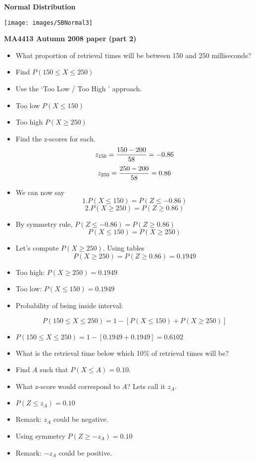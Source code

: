 \documentclass[]{report}
\begin{document}
\noindent \textbf{Normal Distribution}

\begin{center}
	\texttt{[image: images/5BNormal3]}
\end{center}


{
	\noindent \textbf{MA4413 Autumn 2008 paper (part 2)}
	\begin{itemize}
		\item What proportion of retrieval times will be between 150 and 250 milliseconds?
		\item Find $P(150 \leq X \leq 250)$
		\item Use the `Too Low / Too High ' approach.
		\item Too low $P( X \leq 150)$
		\item Too high $P( X \geq 250)$
		\item Find the z-scores for each.
		\[ z_{150} =  {150 - 200 \over 58}  = -0.86 \]
		\[ z_{250} =  {250 - 200 \over 58}  = 0.86 \]
	\end{itemize}
	\begin{itemize}
		\item We can now say
		\[ 1. P( X \leq 150) = P( Z \leq -0.86)\]
		\[ 2. P( X \geq 250) = P( Z \geq 0.86)\]
		\item By symmetry rule, $P( Z \leq -0.86) = P( Z \geq 0.86)$
		\[ P( X \leq 150) =  P( X \geq 250) \]
		\item Let's compute $P( X \geq 250)$. Using tables
		\[P( X \geq 250) = P( Z \geq 0.86) = 0.1949 \]
	\end{itemize}
	\begin{itemize}
		\item Too high: $P( X \geq 250) = 0.1949 $
		\item Too low:  $P( X \leq 150) = 0.1949 $
		\item Probability of being inside interval:
		
		\[ P(150 \leq X \leq 250) = 1- [ P( X \leq 150) + P( X \geq 250)] \]
		
		\item $P(150 \leq X \leq 250) = 1- [ 0.1949 + 0.1949 ] = \boldsymbol{0.6102}$
		
	\end{itemize}
\begin{itemize}
		\item What is the retrieval time below which 10\% of retrieval times will be?
		\item Find $A$ such that $P(X \leq A) = 0.10$.
		\item What z-score would correspond to $A$? Lets call it $z_A$.
		\item $P(Z  \leq z_A) = 0.10$
		\item Remark: $z_A$ could be negative.
		\item Using symmetry $P(Z \geq -z_A) = 0.10$
		\item Remark: $-z_A$ could be positive.
	\end{itemize}
}
\end{document}
